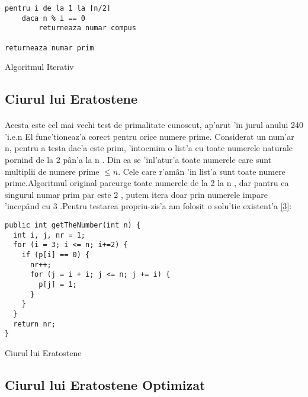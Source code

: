 \documentclass[12pt,twoside]{article}
\numberwithin{figure}{section}
\begin{document}
\lstset{basicstyle=\footnotesize\ttfamily,breaklines=false}
\lstset{framextopmargin=50pt}

\begin{algorithm}
 

\begin{lstlisting}
pentru i de la 1 la [n/2]
	daca n % i == 0
   		returneaza numar compus

returneaza numar prim
\end{lstlisting}
\caption{Algoritmul Iterativ}
\end{algorithm}

\newpage

\subsection{Ciurul lui Eratostene}
\paragraph{}
Acesta este cel mai vechi test de primalitate cunoscut, ap'arut 'in jurul anului 240 'i.e.n El func'tioneaz'a corect pentru orice numere prime. Considerat un num'ar n, pentru a testa dac'a este prim, 'intocmim o list'a cu toate numerele naturale pornind de la 2 p\^an'a la n . Din ea se 'inl'atur'a toate numerele care sunt multiplii de numere prime  $ \leq {n}$. Cele care r'am\^an 'in list'a sunt toate numere prime.Algoritmul original parcurge toate numerele de la 2 la n , dar pantru ca singurul numar prim par este 2 , putem itera doar prin numerele impare 'incep\^and cu 3 .Pentru testarea propriu-zis'a am folosit o solu'tie existent'a \hyperlink{3}{[3]}:


\begin{algorithm}
\begin{lstlisting}
public int getTheNumber(int n) {
  int i, j, nr = 1;
  for (i = 3; i <= n; i+=2) {
    if (p[i] == 0) {
      nr++;
      for (j = i + i; j <= n; j += i) {
        p[j] = 1;
      }
    }
  }
  return nr;
}
\end{lstlisting}
\caption{Ciurul lui Eratostene}
\end{algorithm}





\subsection{Ciurul lui Eratostene Optimizat}
\end{document}
